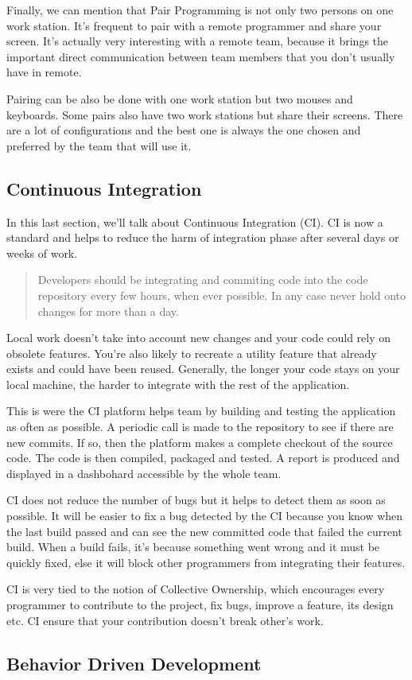 Finally, we can mention that Pair Programming is not only two persons on
one work station.
It's frequent to pair with a remote programmer and share your screen.
It's actually very interesting with a remote team, because it brings the
important direct communication between team members that you don't
usually have in remote.

Pairing can be also be done with one work station but two mouses and
keyboards.
Some pairs also have two work stations but share their screens.
There are a lot of configurations and the best one is always the one
chosen and preferred by the team that will use it.

\subsection{Continuous Integration}\label{subsec:continuous-integration}
In this last section, we'll talk about Continuous Integration (CI).
CI is now a standard and helps to reduce the harm of integration phase
after several days or weeks of work.
\begin{quotation}
    Developers should be integrating and commiting code into the code
    repository every few hours, when ever possible.
    In any case never hold onto changes for more than a day.
\end{quotation}
Local work doesn't take into account new changes and your code could rely
on obsolete features.
You're also likely to recreate a utility feature that already exists and
could have been reused.
Generally, the longer your code stays on your local machine, the harder
to integrate with the rest of the application.

This is were the CI platform helps team by building and testing
the application as often as possible.
A periodic call is made to the repository to see if there are new
commits.
If so, then the platform makes a complete checkout of the source code.
The code is then compiled, packaged and tested.
A report is produced and displayed in a dashbohard accessible by the
whole team.

CI does not reduce the number of bugs but it helps to detect them as soon
as possible.
It will be easier to fix a bug detected by the CI because you know when
the last build passed and can see the new committed code that failed
the current build.
When a build fails, it's because something went wrong and it must be
quickly fixed, else it will block other programmers from integrating
their features.

CI is very tied to the notion of Collective Ownership, which
encourages every programmer to contribute to the project, fix bugs,
improve a feature, its design etc.
CI ensure that your contribution doesn't break other's work.


\subsection{Behavior Driven Development}\label{subsec:bdd}